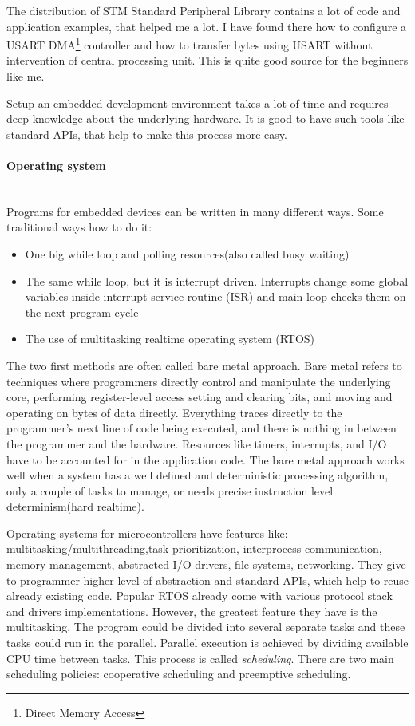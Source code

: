 The distribution of STM Standard Peripheral Library contains a lot of
code and application examples, that helped me a lot. I have found there how to
configure a USART DMA\footnote{Direct Memory Access} controller and how to
transfer bytes using USART without intervention of central processing unit.
This is  quite good source for the beginners like me.

Setup an embedded development environment takes a lot of time and requires
deep knowledge about the underlying hardware. It is good to have such tools like
standard APIs, that help to make this process more easy.

\paragraph{Operating system} ~\\
Programs for embedded devices can be written in many different ways.
Some traditional ways how to do it:
\begin{itemize}
\item One big while loop and polling resources(also called busy waiting)
\item The same while loop, but it is interrupt driven.
Interrupts change some global variables inside interrupt service routine (ISR)
and main loop checks them on the next program cycle
\item The use of multitasking realtime operating system (RTOS) 
\end{itemize} 

The two first methods are often called bare metal approach.
Bare metal refers to techniques where programmers directly control and manipulate the underlying core, performing register-level access setting and clearing bits, and moving and operating on bytes of data directly.
Everything traces directly to the programmer’s next line of code being executed, and there is nothing in between the programmer and the hardware.
Resources like timers, interrupts, and I/O have to be accounted for in the application code.
The bare metal approach works well when a system has a  well defined and deterministic processing algorithm, only a couple of tasks to manage, or needs precise instruction level determinism(hard realtime).

Operating systems for microcontrollers have features like: 
multitasking/multithreading,task prioritization, interprocess communication, memory management, abstracted I/O drivers, file systems, networking.
They give to programmer higher level of abstraction and standard APIs, which help to reuse already existing code.
Popular RTOS already come with various protocol stack and drivers implementations.
However, the greatest feature they have is the multitasking. 
The program could be divided into several separate tasks and these tasks could run in the parallel.
Parallel execution is achieved by dividing available CPU time between tasks.
This process is called \textit{scheduling}. 
There are two main scheduling policies: cooperative scheduling and preemptive scheduling.


